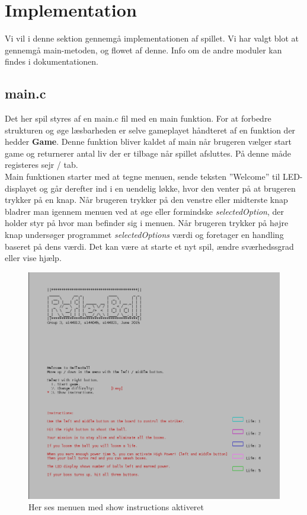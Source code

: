 \section{Implementation}
Vi vil i denne sektion gennemgå implementationen af spillet. Vi har valgt blot at gennemgå main-metoden, og flowet af denne. Info om de andre moduler kan findes i dokumentationen.
\subsection{main.c}
Det her spil styres af en main.c fil med en main funktion. For at forbedre strukturen og øge læsbarheden er selve gameplayet håndteret af en funktion der hedder \textbf{Game}. Denne funktion bliver kaldet af main når brugeren vælger start game og returnerer antal liv der er tilbage når spillet afsluttes. På denne måde registeres sejr /  tab. \\
Main funktionen starter med at tegne menuen, sende teksten ”Welcome” til LED-displayet og går derefter ind i en uendelig løkke, hvor den venter på at brugeren trykker  på en knap. Når brugeren trykker på den venstre  eller  midterste knap bladrer man igennem menuen ved at øge eller formindske \textit{selectedOption}, der holder styr på hvor man befinder sig i menuen. Når brugeren trykker på højre knap undersøger programmet \textit{selectedOptions} værdi og foretager en handling baseret på dens værdi. Det kan være at starte et nyt spil, ændre sværhedssgrad eller vise hjælp.\\
\begin{figure}[h]
\begin{center}
\includegraphics[scale=0.6]{img/Menu.png}
\caption{Her ses menuen med show instructions aktiveret}
\end{center}
\end{figure}
